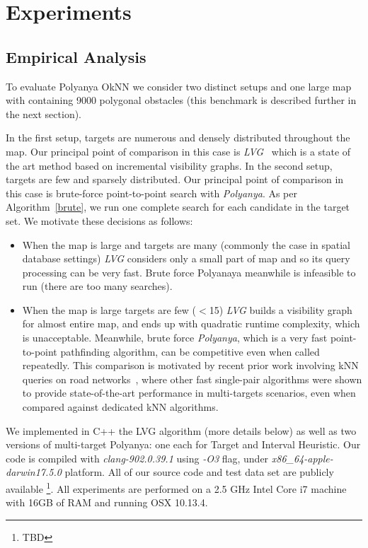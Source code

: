 \chapter{Experiments}
\section{Empirical Analysis} \label{exp}
To evaluate Polyanya OkNN we consider two distinct setups and one large map with 
containing 9000 polygonal obstacles (this benchmark is described further in the next section).

In the first setup, targets are numerous and densely distributed throughout
the map. Our principal point of comparison in this case is \textit{LVG}~\cite{zhang2004spatial} which
is a state of the art method based on incremental visibility graphs. 
In the second setup, targets are few and sparsely distributed. Our principal point of comparison in
this case is brute-force
point-to-point search with \textit{Polyanya}. As per Algorithm~\ref{brute}, we run one complete search for each candidate in the target set. We motivate these decisions as follows:

\begin{itemize}[leftmargin=1cm]
\item When the map is large and targets are many (commonly the case in spatial database settings) \textit{LVG} considers only a small part of map and so its query processing can be very fast. Brute force Polyanaya meanwhile is infeasible to run (there are too many searches).

\item When the map is large targets are few ($<$15) \textit{LVG} builds a visibility graph for almost entire map, and ends up with quadratic runtime complexity, which is unacceptable. Meanwhile, brute force \textit{Polyanya}, which is a very fast point-to-point pathfinding algorithm, can be competitive even when called repeatedly. This comparison is motivated by recent prior work involving kNN queries on road networks~\cite{abeywickrama2016k}, where other fast single-pair algorithms were shown to provide state-of-the-art performance in multi-targets scenarios, even when compared against dedicated kNN algorithms.
\end{itemize}

We implemented in C++ the LVG algorithm (more details below) as well as two versions of multi-target Polyanya: one each for Target and Interval Heuristic. Our code is compiled with \textit{clang-902.0.39.1} using \textit{-O3} flag, under \textit{x86\_64-apple-darwin17.5.0} platform. All of our source code and test data set are  publicly available \footnote{TBD}. All experiments are performed on a 2.5 GHz Intel Core i7 machine with 16GB of RAM and running OSX 10.13.4. 

